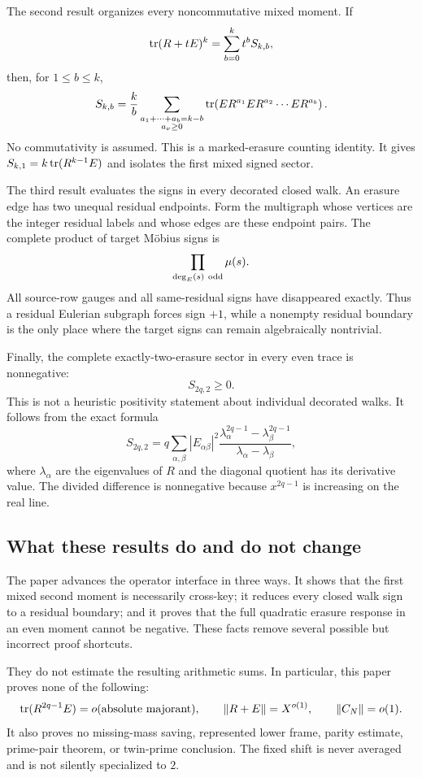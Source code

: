 The second result organizes every noncommutative mixed moment.  If
\[
 \operatorname{tr}(R+tE)^k=\sum_{b=0}^kt^bS_{k,b},
\]
then, for \(1\le b\le k\),
\[
 S_{k,b}
 =
 \frac{k}{b}
 \sum_{\substack{a_1+\cdots+a_b=k-b\\a_\nu\ge0}}
 \operatorname{tr}\!\left(
 E R^{a_1}E R^{a_2}\cdots E R^{a_b}
 \right).
\]
No commutativity is assumed.  This is a marked-erasure counting identity.
It gives \(S_{k,1}=k\operatorname{tr}(R^{k-1}E)\) and isolates the first mixed signed
sector.

The third result evaluates the signs in every decorated closed walk.  An
erasure edge has two unequal residual endpoints.  Form the multigraph whose
vertices are the integer residual labels and whose edges are these endpoint
pairs.  The complete product of target Möbius signs is
\[
 \prod_{\deg_E(s)\ {\rm odd}}\mu(s).
\]
All source-row gauges and all same-residual signs have disappeared
exactly.  Thus a residual Eulerian subgraph forces sign \(+1\), while a
nonempty residual boundary is the only place where the target signs can
remain algebraically nontrivial.

Finally, the complete exactly-two-erasure sector in every even trace is
nonnegative:
\[
 S_{2q,2}\ge0.
\]
This is not a heuristic positivity statement about individual decorated
walks.  It follows from the exact formula
\[
 S_{2q,2}
 =
 q\sum_{\alpha,\beta}|E_{\alpha\beta}|^2
 \frac{\lambda_\alpha^{2q-1}-\lambda_\beta^{2q-1}}
      {\lambda_\alpha-\lambda_\beta},
\]
where \(\lambda_\alpha\) are the eigenvalues of \(R\) and the diagonal
quotient has its derivative value.  The divided difference is nonnegative
because \(x^{2q-1}\) is increasing on the real line.

\subsection{What these results do and do not change}

The paper advances the operator interface in three ways.  It shows that the
first mixed second moment is necessarily cross-key; it reduces every closed
walk sign to a residual boundary; and it proves that the full quadratic
erasure response in an even moment cannot be negative.  These facts remove
several possible but incorrect proof shortcuts.

They do not estimate the resulting arithmetic sums.  In particular, this
paper proves none of the following:
\[
 \operatorname{tr}(R^{2q-1}E)=o(\text{absolute majorant}),\qquad
 \|R+E\|=X^{o(1)},\qquad
 \|C_N\|=o(1).
\]
It also proves no missing-mass saving, represented lower frame, parity
estimate, prime-pair theorem, or twin-prime conclusion.  The fixed shift is
never averaged and is not silently specialized to \(2\).

